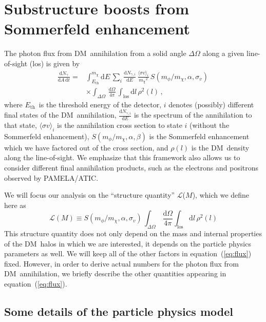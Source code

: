 \documentclass[aps,prd,twocolumn,amsmath,amssymb,floatfix,nofootinbib,10pt]{revtex4}
\newcommand{\DM}{DM}
\newcommand{\somm}{\ensuremath{S}}
\newcommand{\mdm}{\ensuremath{m_{\chi}}}
\newcommand{\mv}{\ensuremath{m_{\phi}}}
\newcommand{\dd}{\mathrm{d}}
\newcommand{\eqnname}{equation}
\newcommand{\Ngamma}{\ensuremath{N_{\gamma}}}
\newcommand{\Ngammai}{\ensuremath{N_{\gamma,i}}}
\newcommand{\Eth}{\ensuremath{E_{\mathrm{th}}}}
\newcommand{\sigmaannv}{\ensuremath{\langle\sigma v\rangle}}
\newcommand{\los}{los}
\newcommand{\sigv}{\ensuremath{\sigma_v}}
\newcommand{\lum}{\ensuremath{\mathcal{L}}}
\begin{document}
\section{Substructure boosts from Sommerfeld enhancement}
The photon flux from \DM\ annihilation from a solid angle
$\Delta\Omega$ along a given line-of-sight (\los) is given by
\begin{equation}\label{eq:flux}
\begin{split}
\frac{\dd \Ngamma}{\dd A \,\dd t}  = &
\int_{\Eth}^{\mdm}\dd E\, \sum_i \frac{\dd
\Ngammai}{\dd E} \,\frac{\sigmaannv_i}{\mdm^2}\,
\somm\left(\mv/\mdm,\alpha,\sigv\right)\,\\
& \times \int_{\Delta\Omega}\,\frac{\dd\Omega}{4\pi}\,\int_{\mathrm{\los}} \dd l\,
\rho^2(l)\, ,
\end{split}
\end{equation}
where \Eth\ is the threshold energy of the detector, $i$ denotes
(possibly) different final states of the \DM\ annihilation, $\frac{\dd
\Ngammai}{\dd E}$ is the spectrum of the annihilation to that state,
$\sigmaannv_i$ is the annihilation cross section to state $i$ (without
the Sommerfeld enhancement), $\somm\left(\mv/\mdm,\alpha,\beta\right)$
is the Sommerfeld enhancement which we have factored out of the cross
section, and $\rho(l)$ is the \DM\ density along the line-of-sight. We
emphasize that this framework also allows us to consider different
final annihilation products, such as the electrons and positrons
observed by PAMELA/ATIC.

We will focus our analysis on the ``structure quantity'' \lum($M$),
which we define here as
\begin{equation}\label{eq:structquant}
\lum(M)\equiv\somm\left(\mv/\mdm,\alpha,\sigv\right)\,\int_{\Delta\Omega}\,\frac{\dd\Omega}{4\pi}\int_{\mathrm{\los}}
\dd l\, \rho^2(l)
\end{equation}
This structure quantity does not only depend on the mass and internal
properties of the \DM\ halos in which we are interested, it depends on
the particle physics parameters as well. We will keep all of the other
factors in \eqnname\ (\ref{eq:flux}) fixed. However, in order to
derive actual numbers for the photon flux from \DM\ annihilation, we
briefly describe the other quantities appearing in \eqnname\
(\ref{eq:flux}).

\subsection{Some details of the particle physics model}\label{sec:partphys}
\end{document}
